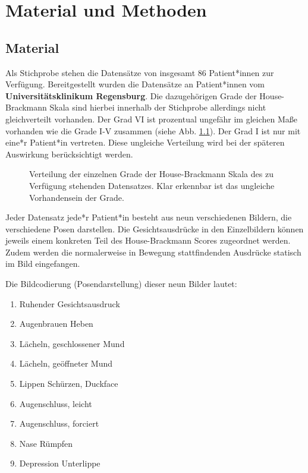 \chapter{Material und Methoden}\label{mat_and_method}
\section{Material}\label{material}
Als Stichprobe stehen die Datensätze von insgesamt 86 Patient*innen zur Verfügung. Bereitgestellt wurden die Datensätze an Patient*innen vom \textbf{Universitätsklinikum Regensburg}. Die dazugehörigen Grade der House-Brackmann Skala sind hierbei innerhalb der Stichprobe allerdings nicht gleichverteilt vorhanden. Der Grad VI ist prozentual ungefähr im gleichen Maße vorhanden wie die Grade I-V zusammen (siehe Abb. \ref{cap:pie_grade}). Der Grad I ist nur mit eine*r Patient*in vertreten. Diese ungleiche Verteilung wird bei der späteren Auswirkung berücksichtigt werden.

\begin{figure}[!b]\centering
{}
\caption[Verteilung der einzelnen Grade der House-Brackmann Skala]{Verteilung der einzelnen Grade der House-Brackmann Skala des zu Verfügung stehenden Datensatzes. Klar erkennbar ist das ungleiche Vorhandensein der Grade.}\label{cap:pie_grade}
\end{figure}\label{fig:pie_grade}


Jeder Datensatz jede*r Patient*in besteht aus neun verschiedenen Bildern, die verschiedene Posen darstellen. Die Gesichtsausdrücke in den Einzelbildern können jeweils einem konkreten Teil des House-Brackmann Scores zugeordnet werden. Zudem werden die normalerweise in Bewegung stattfindenden Ausdrücke statisch im Bild eingefangen.

\clearpage

Die Bildcodierung (Posendarstellung) dieser neun Bilder lautet:

\begin{enumerate}
  \setlength\itemsep{-0.6em}
\item Ruhender Gesichtsausdruck
\item Augenbrauen Heben
\item Lächeln, geschlossener Mund
\item Lächeln, geöffneter Mund
\item Lippen Schürzen, \glqq Duckface\grqq{}
\item Augenschluss, leicht
\item Augenschluss, forciert
\item Nase Rümpfen
\item Depression Unterlippe
\end{enumerate}

